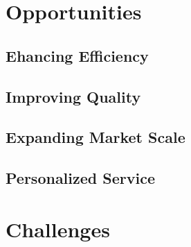 \documentclass[fleqn,10pt]{SelfArx} %
\begin{document}







\section{Opportunities}

\subsection{Ehancing Efficiency}
\subsection{Improving Quality}
\subsection{Expanding Market Scale}
\subsection{Personalized Service}

\section{Challenges}
\end{document}
